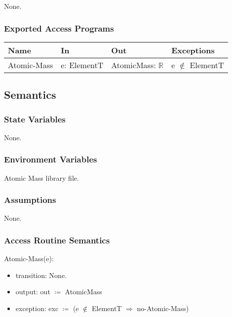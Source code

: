 \documentclass[12pt, titlepage]{article}
\begin{document}
None.


\subsubsection{Exported Access Programs}

\begin{center}
\begin{tabular}{p{2cm} p{4cm} p{4cm} p{2cm}}
\hline
\textbf{Name} & \textbf{In} & \textbf{Out} & \textbf{Exceptions} \\
\hline
{Atomic-Mass} & e: ElementT & AtomicMass: $\mathbb{R}$ & e $\notin$ ElementT  \\
\hline
\end{tabular}
\end{center}

\subsection{Semantics}

\subsubsection{State Variables}

None.

\subsubsection{Environment Variables}

Atomic Mass library file.

\subsubsection{Assumptions}

None.

\subsubsection{Access Routine Semantics}

\noindent Atomic-Mass(e):
\begin{itemize}
\item transition: None.
\item output:  out $\coloneqq$ AtomicMass 
\item exception: exc $\coloneqq$ (e $\notin$ ElementT $\Rightarrow$  no-Atomic-Mass)
\end{itemize}
\end{document}
